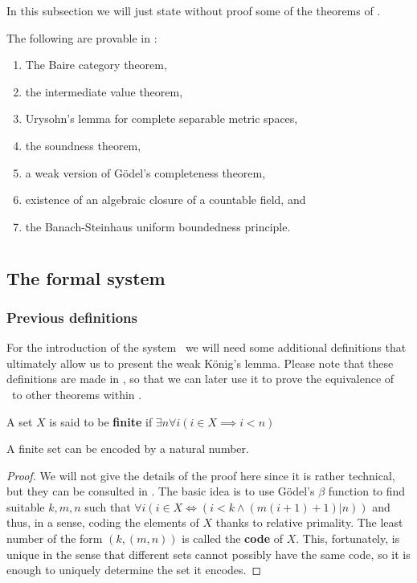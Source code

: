 \documentclass[../main.tex]{memoir}
\begin{document}
In this subsection we will just state without proof some of the theorems of \rca.

\begin{theorem}
  The following are provable in \rca:

  \begin{enumerate}
  \item The Baire category theorem,
  \item the intermediate value theorem,
  \item Urysohn's lemma for complete separable metric spaces,
  \item the soundness theorem,
  \item a weak version of Gödel's completeness theorem,
  \item existence of an algebraic closure of a countable field, and
  \item the Banach-Steinhaus uniform boundedness principle.
  \end{enumerate}
\end{theorem}

\section{\wkl}

\subsection{The formal system}

\subsubsection{Previous definitions}

For the introduction of the system \wkl\ we will need some additional definitions that ultimately allow us to present the weak König's lemma. Please note that these definitions are made in \rca, so that we can later use it to prove the equivalence of \wkl\ to other theorems within \rca.

\begin{definition}
  A set $X$ is said to be \textbf{finite} if $\exists n \forall i (i \in X \implies i < n)$
\end{definition}

\begin{theorem}
  A finite set can be encoded by a natural number.
\end{theorem}
\begin{proof}
  We will not give the details of the proof here since it is rather technical, but they can be consulted in \cite{simpson}. The basic idea is to use Gödel's $\beta$ function to find suitable $k, m, n$ such that $\forall i (i \in X \iff (i < k \land (m(i + 1) + 1) \vert n))$ and thus, in a sense, coding the elements of $X$ thanks to relative primality. The least number of the form $(k, (m, n))$ is called the \textbf{code} of $X$. This, fortunately, is unique in the sense that different sets cannot possibly have the same code, so it is enough to uniquely determine the set it encodes.
\end{proof}
\end{document}
